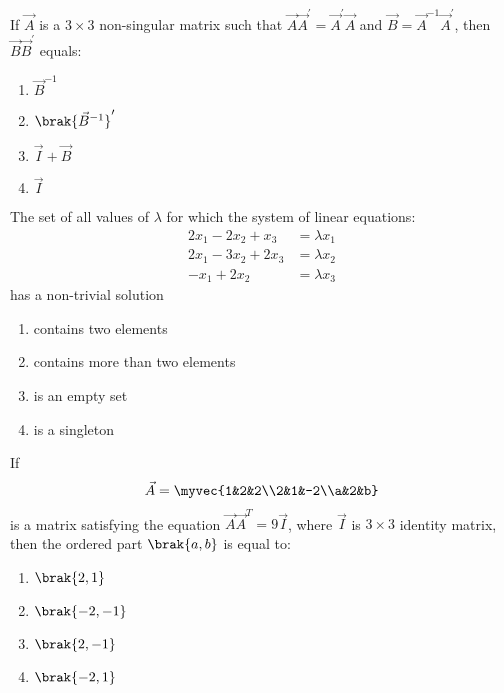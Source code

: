 	\item If $\vec{A}$ is a $3\times3$ non-singular matrix such that $\vec{A}\vec{A}^{\prime}=\vec{A}^{\prime}\vec{A}$ and $\vec{B}=\vec{A}^{-1}\vec{A}^{\prime}$, then $\vec{B}\vec{B}^{\prime}$ equals:
	\hfill {}{\par}
	\begin{enumerate}
	    	\item $\vec{B}^{-1}$
		\item $\brak{\vec{B}^{-1}}^{\prime}$
		\item $\vec{I}+\vec{B}$ 
		\item $\vec{I}$
        \end{enumerate}


    \item The set of all values of $\lambda$ for which the system of linear equations:
	\begin{align*}
		2x_1-2x_2+x_3 &= \lambda x_1\\
		2x_1-3x_2+2x_3 &= \lambda x_2\\
		-x_1+2x_2 &= \lambda x_3
	\end{align*}
	has a non-trivial solution

	\hfill{}
	\begin{enumerate}
		\item contains two elements
		\item contains more than two elements
		\item is an empty set
		\item is a singleton
	\end{enumerate}


	\item If \begin{align*} \vec{A} = \myvec{1&2&2\\2&1&-2\\a&2&b} \end{align*} is a matrix satisfying the equation $\vec{A}\vec{A}^T = 9\vec{I}$, where $\vec{I}$ is $3\times3$ identity matrix, then the ordered part $\brak{a,b}$ is equal to:
	\hfill {}{\par}
	\begin{enumerate}
	    	\item $\brak{2,1}$ 
	    	\item $\brak{-2,-1}$ 
	    	\item $\brak{2,-1}$ 
	   	\item $\brak{-2,1}$ 
	\end{enumerate}


